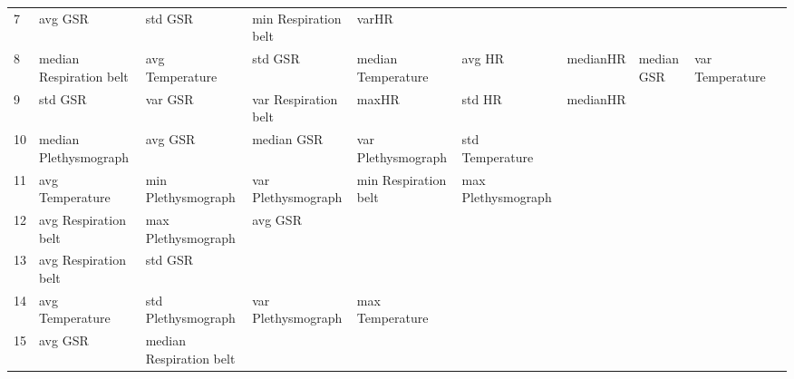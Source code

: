 \begin{landscape}
\begin{table}[]
\begin{tabular}{l|llllllll}
7        & avg GSR                 & std GSR                 & min Respiration belt    & varHR                   &                         &                       &                         &                         &                         &         \\
8        & median Respiration belt & avg Temperature         & std GSR                 & median Temperature      & avg HR                  & medianHR              & median GSR              & var Temperature         &                         &         \\
9        & std GSR                 & var GSR                 & var Respiration belt    & maxHR                   & std HR                  & medianHR              &                         &                         &                         &         \\
10       & median Plethysmograph   & avg GSR                 & median GSR              & var Plethysmograph      & std Temperature         &                       &                         &                         &                         &         \\
11       & avg Temperature         & min Plethysmograph      & var Plethysmograph      & min Respiration belt    & max Plethysmograph      &                       &                         &                         &                         &         \\
12       & avg Respiration belt    & max Plethysmograph      & avg GSR                 &                         &                         &                       &                         &                         &                         &         \\
13       & avg Respiration belt    & std GSR                 &                         &                         &                         &                       &                         &                         &                         &         \\
14       & avg Temperature         & std Plethysmograph      & var Plethysmograph      & max Temperature         &                         &                       &                         &                         &                         &         \\
15       & avg GSR                 & median Respiration belt &                         &                         &                         &                       &                         &                         &                         &         \\

\end{tabular}
\end{table}
\end{landscape}
